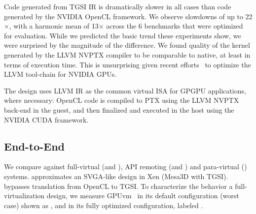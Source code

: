 Code generated from TGSI IR is dramatically slower in all cases than code
generated by the NVIDIA OpenCL framework. We observe slowdowns of up to 22$
\times$, with a harmonic mean of 13$\times$ across the 6 benchmarks that were
optimized for evaluation.
While we
predicted the basic trend these experiments show, we were surprised by the
magnitude of the difference. We found quality of the kernel generated by the
LLVM NVPTX compiler to be comparable to native, at least in terms of execution
time. This is unsurprising given recent efforts~\cite{gpucc} to optimize the
LLVM tool-chain for NVIDIA GPUs.

The \Trillium design uses LLVM IR as the common virtual ISA for GPGPU applications,
where necessary: OpenCL code is compiled to PTX using the LLVM NVPTX back-end in the guest,
and then finalized and executed in the host using the NVIDIA CUDA framework.



\subsection{End-to-End}


We compare \Trillium against full-virtual (\gpuvmdef and \gpuvmopt),
API remoting (\apigpu and \apicpu) and para-virtual (\XenSVGA) systems.
\XenSVGA approximates an SVGA-like design in Xen (Mesa3D with TGSI). \Trillium
bypasses translation from OpenCL to TGSI.
To characterize the behavior a full-virtual\-ization design, we measure
GPUvm~\cite{GPUvm} in its default configuration (worst case) shown as \gpuvmdef,
and in its fully optimized configuration, labeled \gpuvmopt.


